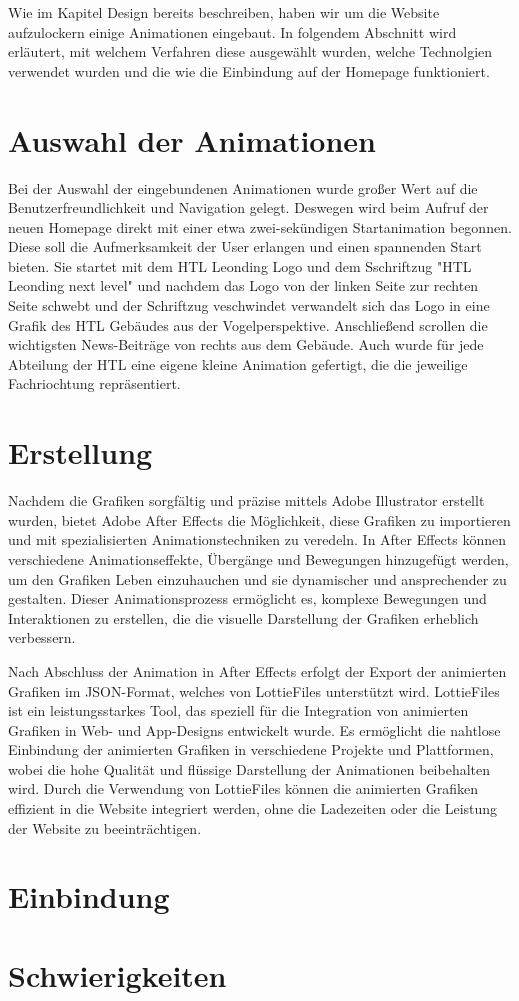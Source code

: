 Wie im Kapitel Design bereits beschreiben, haben wir um die Website aufzulockern einige Animationen eingebaut. 
In folgendem Abschnitt wird erläutert, mit welchem Verfahren diese ausgewählt wurden, welche Technolgien verwendet wurden und die 
wie die Einbindung auf der Homepage funktioniert.

\section{Auswahl der Animationen} \label{sec:Recherche}

Bei der Auswahl der eingebundenen Animationen wurde großer Wert auf die Benutzerfreundlichkeit und Navigation gelegt.
Deswegen wird beim Aufruf der neuen Homepage direkt mit einer etwa zwei-sekündigen Startanimation begonnen. Diese soll die 
Aufmerksamkeit der User erlangen und einen spannenden Start bieten. Sie startet mit dem HTL Leonding Logo und dem Sschriftzug "HTL Leonding next level" und nachdem
das Logo von der linken Seite zur rechten Seite schwebt und der Schriftzug veschwindet verwandelt sich das Logo in eine Grafik des 
HTL Gebäudes aus der Vogelperspektive. Anschließend scrollen die wichtigsten News-Beiträge von rechts aus dem Gebäude. 
Auch wurde für jede Abteilung der HTL eine eigene kleine Animation gefertigt, die die jeweilige Fachriochtung repräsentiert.


\section{Erstellung} \label{sec:Recherche}

Nachdem die Grafiken sorgfältig und präzise mittels Adobe Illustrator erstellt wurden, bietet Adobe After Effects die Möglichkeit, 
diese Grafiken zu importieren und mit spezialisierten Animationstechniken zu veredeln. In After Effects können verschiedene Animationseffekte, 
Übergänge und Bewegungen hinzugefügt werden, um den Grafiken Leben einzuhauchen und sie dynamischer und ansprechender zu gestalten. 
Dieser Animationsprozess ermöglicht es, komplexe Bewegungen und Interaktionen zu erstellen, die die visuelle Darstellung der Grafiken 
erheblich verbessern.

Nach Abschluss der Animation in After Effects erfolgt der Export der animierten Grafiken im JSON-Format, welches von LottieFiles 
unterstützt wird. LottieFiles ist ein leistungsstarkes Tool, das speziell für die Integration von animierten Grafiken in Web- und 
App-Designs entwickelt wurde. Es ermöglicht die nahtlose Einbindung der animierten Grafiken in verschiedene Projekte und Plattformen, 
wobei die hohe Qualität und flüssige Darstellung der Animationen beibehalten wird. Durch die Verwendung von LottieFiles können die 
animierten Grafiken effizient in die Website integriert werden, ohne die Ladezeiten oder die Leistung der Website zu beeinträchtigen.


\section{Einbindung} \label{sec:Recherche}


\section{Schwierigkeiten} \label{sec:Recherche}



